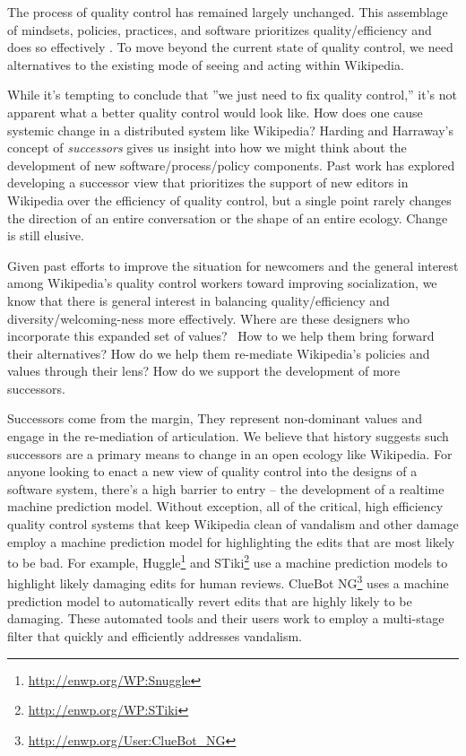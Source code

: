 The process of quality control has remained largely unchanged.  This assemblage of mindsets, policies, practices, and software prioritizes quality/efficiency and does so effectively \cite{geiger2013levee}\cite{halfaker2014snuggle}.  To move beyond the current state of quality control, we need alternatives to the existing mode of seeing and acting within Wikipedia.

While it's tempting to conclude that ''we just need to fix quality control,'' it's not apparent what a better quality control would look like.  How does one cause systemic change in a distributed system like Wikipedia?  Harding and Harraway's concept of \emph{successors}\cite{haraway1988situated}\cite{harding1987feminism} gives us insight into how we might think about the development of new software/process/policy components.  Past work has explored developing a successor view that prioritizes the support of new editors in Wikipedia over the efficiency of quality control\cite{halfaker2014snuggle}\cite{geiger2014successor}, but a single point rarely changes the direction of an entire conversation or the shape of an entire ecology. Change is still elusive.

Given past efforts to improve the situation for newcomers\cite{morgan2013tea} and the general interest among Wikipedia's quality control workers toward improving socialization\cite{halfaker2014snuggle}, we know that there is general interest in balancing quality/efficiency and diversity/welcoming-ness more effectively.  Where are these designers who incorporate this expanded set of values?  How to we help them bring forward their alternatives?  How do we help them re-mediate Wikipedia's policies and values through their lens?  How do we support the development of more successors.

Successors come from the margin, They represent non-dominant values and engage in the re-mediation of articulation\cite{mugar2017preserving}.  We believe that history suggests such successors are a primary means to change in an open ecology like Wikipedia.  For anyone looking to enact a new view of quality control into the designs of a software system, there's a high barrier to entry -- the development of a realtime machine prediction model.  Without exception, all of the critical, high efficiency quality control systems that keep Wikipedia clean of vandalism and other damage employ a machine prediction model for highlighting the edits that are most likely to be bad. For example, Huggle\footnote{\url{http://enwp.org/WP:Snuggle}} and STiki\footnote{\url{http://enwp.org/WP:STiki}} use a machine prediction models to highlight likely damaging edits for human reviews.  ClueBot NG\footnote{\url{http://enwp.org/User:ClueBot_NG}} uses a machine prediction model to automatically revert edits that are highly likely to be damaging.  These automated tools and their users work to employ a multi-stage filter that quickly and efficiently addresses vandalism\cite{geiger2013levee}.


